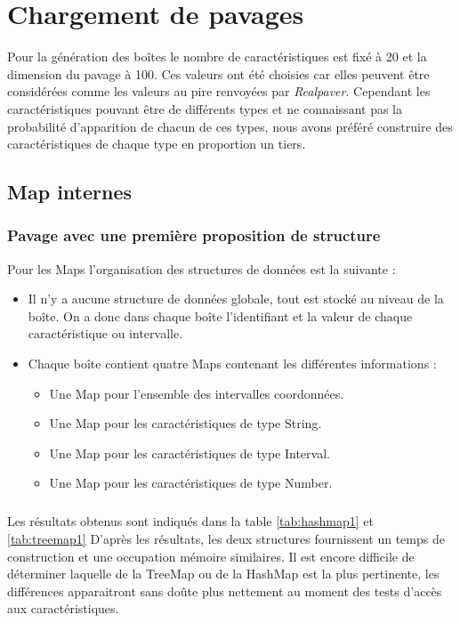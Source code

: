 \chapter{Chargement de pavages}
\label{chap:Chargement}
Pour la génération des boîtes le nombre de caractéristiques est fixé à 20 et la dimension du pavage à 100. Ces valeurs ont été choisies car elles peuvent être considérées comme les valeurs au pire renvoyées par \emph{Realpaver}. Cependant les caractéristiques pouvant être de différents types et ne connaissant pas la probabilité d'apparition de chacun de ces types, nous avons préféré construire des caractéristiques de chaque type en proportion un tiers. 

\section{Map internes}

\subsection{Pavage avec une première proposition de structure}
Pour les Maps l'organisation des structures de données est la suivante :
\begin{itemize}
\item Il n'y a aucune structure de données globale, tout est stocké au niveau de la boîte. On a donc dans chaque boîte l'identifiant et la valeur de chaque caractéristique ou intervalle.
 \item Chaque boîte contient quatre Maps contenant les différentes informations :
\begin{itemize}
 \item Une Map pour l'ensemble des intervalles coordonnées.
\item Une Map pour les caractéristiques de type String.
\item Une Map pour les caractéristiques de type Interval.
\item Une Map pour les caractéristiques de type Number.
\end{itemize}
\end{itemize}

\paragraph{}Les résultats obtenus sont indiqués dans la table \ref{tab:hashmap1} et \ref{tab:treemap1}
D'après les résultats, les deux structures fournissent un temps de construction et une occupation mémoire similaires.
Il est encore difficile de déterminer laquelle de la TreeMap ou de la HashMap est la plus pertinente, les différences apparaitront sans doûte plus nettement au moment des tests d'accès aux caractéristiques. 


